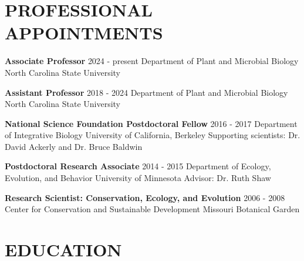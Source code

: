 \documentclass[11pt,english]{article}
\begin{document}
\begin{flushleft}
\section*{PROFESSIONAL APPOINTMENTS}
\vspace{-0.5ex}

{\bf Associate Professor} \hfill {2024 - present} \newline
Department of Plant and Microbial Biology \newline
North Carolina State University
\vspace{0.5ex}

{\bf Assistant Professor} \hfill {2018 - 2024} \newline
Department of Plant and Microbial Biology \newline
North Carolina State University
\vspace{0.5ex}

{\bf National Science Foundation Postdoctoral Fellow} \hfill {2016 - 2017} \newline
Department of Integrative Biology \newline
University of California, Berkeley \newline
Supporting scientists: Dr. David Ackerly and Dr. Bruce Baldwin
\vspace{0.5ex}

{\bf Postdoctoral Research Associate} \hfill {2014 - 2015} \newline
Department of Ecology, Evolution, and Behavior \newline
University of Minnesota \newline
Advisor: Dr. Ruth Shaw
\vspace{0.5ex}

{\bf Research Scientist: Conservation, Ecology, and Evolution} \hfill {2006 - 2008} \newline
Center for Conservation and Sustainable Development \newline
Missouri Botanical Garden


\vspace{1ex}
\section*{EDUCATION}
\vspace{-0.5ex}


\end{flushleft}
\end{document}
